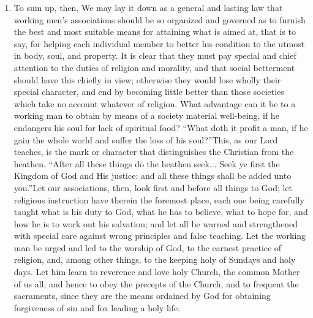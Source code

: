 \documentclass{book}
\begin{document}
\begin{enumerate}
	\item To sum up, then, We may lay it down as a general and lasting law that working men’s associations should be so organized and governed as to furnish the best and most suitable means for attaining what is aimed at, that is to say, for helping each individual member to better his condition to the utmost in body, soul, and property. It is clear that they must pay special and chief attention to the duties of religion and morality, and that social betterment should have this chiefly in view; otherwise they would lose wholly their special character, and end by becoming little better than those societies which take no account whatever of religion. What advantage can it be to a working man to obtain by means of a society material well-being, if he endangers his soul for lack of spiritual food? “What doth it profit a man, if he gain the whole world and suffer the loss of his soul?”\footnotemark[37] This, as our Lord teaches, is the mark or character that distinguishes the Christian from the heathen. “After all these things do the heathen seek... Seek ye first the Kingdom of God and His justice: and all these things shall be added unto you.”\footnotemark[38] Let our associations, then, look first and before all things to God; let religious instruction have therein the foremost place, each one being carefully taught what is his duty to God, what he has to believe, what to hope for, and how he is to work out his salvation; and let all be warned and strengthened with special care against wrong principles and false teaching. Let the working man be urged and led to the worship of God, to the earnest practice of religion, and, among other things, to the keeping holy of Sundays and holy days. Let him learn to reverence and love holy Church, the common Mother of us all; and hence to obey the precepts of the Church, and to frequent the sacraments, since they are the means ordained by God for obtaining forgiveness of sin and fox leading a holy life.



\end{enumerate}
\end{document}
